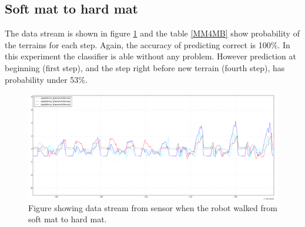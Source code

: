 \documentclass[USenglish]{ifimaster}  %
\begin{document}
\subsection{Soft mat to hard mat}
The data stream is shown in figure \ref{fig:MM_4_Resten_BGraf} and the table \ref{MM4MB} show probability of the terrains for each step. Again, the accuracy of predicting correct is 100\%. In this experiment the classifier is able without any problem. However prediction at beginning (first step), and the step right before new terrain (fourth step), has probability under 53\%.
	
	\begin{figure}[h]
		\centering
		\includegraphics[width=\textwidth,height=\textheight,keepaspectratio]{Figures/MM_4Resten_MB}
		\caption{Figure showing data stream from sensor when the robot walked from soft mat to hard mat.}
		\label{fig:MM_4_Resten_BGraf}
	\end{figure}
	
	\begin{table}[h]
		\centering
		\caption{The table showing probability of each terrain per step walking from soft mat to hard mat. Marked green represent correct prediction and correct terrain, red represent wrong prediction and yellow is the correct prediction if it got wrong.}
		\label{MM4MB}
	\end{table}
	\FloatBarrier
	\clearpage
\end{document}
